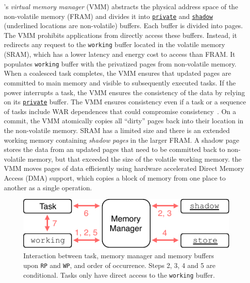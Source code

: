 %
\sys's {\em virtual memory manager} (VMM) abstracts the physical address space of the non-volatile memory (FRAM) and divides it into \texttt{\underline{private}} and \texttt{\underline{shadow}} (underlined locations are non-volatile) buffers. Each buffer is divided into pages. The VMM prohibits applications from directly access these buffers. Instead, it redirects any request to the \texttt{working} buffer located in the volatile memory (SRAM), which has a lower latency and energy cost to access than FRAM. It populates \texttt{working} buffer with the privatized pages from non-volatile memory. When a coalesced task completes, the VMM ensures that updated pages are committed to main memory and visible to subsequently executed tasks. If the power interrupts a task, the VMM ensures the consistency of the data by relying on its \texttt{\underline{private}} buffer. The VMM ensures consistency even if a task or a sequence of tasks include WAR dependences that could compromise consistency~\cite{ratchet,dino}.
%
On a commit, the VMM atomically copies all ``dirty'' pages back into their location in the non-volatile memory.
%
SRAM has a limited size and there is an extended working memory containing {\em
shadow pages} in the larger FRAM.  A shadow page stores the data from an
updated pages that need to be committed back to non-volatile memory, but that
exceeded the size of the volatile working memory.
%
the VMM moves pages of data efficiently using hardware accelerated Direct Memory
Access (DMA) support, which copies a block of memory from one place to another
as a single operation.\\
%
\begin{figure}
    \centering
    \includegraphics[width=\columnwidth]{figures/mem-man.pdf}
    \caption{Interaction between task, memory manager and memory buffers upon \texttt{RP} and \texttt{WP},
    and order of occurrence. Steps 2, 3, 4 and 5 are conditional. Tasks only have direct access to the
    \texttt{working} buffer.}
    \label{figure:mem-man}
\end{figure}
